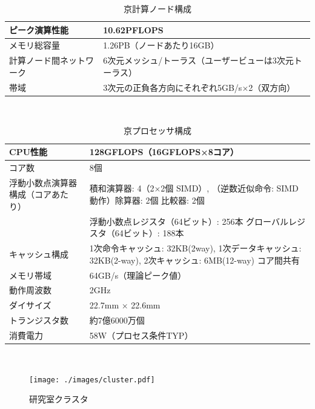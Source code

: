 \begin{table}[htb]
  \begin{center}
    \caption{京計算ノード構成}
    \begin{tabular}{|p{4cm}|p{10cm}|}
      \hline
      ピーク演算性能 & 10.62PFLOPS \\ \hline
      メモリ総容量 & 1.26PB（ノードあたり16GB）\\ \hline
      計算ノード間ネットワーク & 6次元メッシュ/トーラス（ユーザービューは3次元トーラス）\\ \hline
      帯域 & 3次元の正負各方向にそれぞれ5GB/s×2（双方向）\\ \hline
    \end{tabular}
    \label{table:k}
  \end{center}
\end{table}~\\

\vspace{2cm}
\begin{table}[ht]
  \begin{center}
    \caption{京プロセッサ構成}
    \begin{tabular}{|p{6cm}|p{8cm}|}
      \hline
      CPU性能 & 128GFLOPS（16GFLOPS×8コア）\\ \hline
      コア数 & 8個\\ \hline
      浮動小数点演算器構成（コアあたり）& 積和演算器: 4（2×2個 SIMD）, （逆数近似命令: SIMD 動作）除算器: 2個 比較器: 2個\\
      & 浮動小数点レジスタ（64ビット）: 256本 グローバルレジスタ（64ビット）: 188本\\ \hline
      キャッシュ構成 & 1次命令キャッシュ: 32KB(2way), 1次データキャッシュ: 32KB(2-way), 2次キャッシュ: 6MB(12-way) コア間共有\\ \hline
      メモリ帯域 & 64GB/s（理論ピーク値）\\ \hline
      動作周波数 & 2GHz \\ \hline
      ダイサイズ & 22.7mm × 22.6mm \\ \hline
      トランジスタ数 & 約7億6000万個 \\ \hline
      消費電力 & 58W（プロセス条件TYP）\\ \hline
    \end{tabular}
    \label{table:k-processor}
  \end{center}
\end{table}~\\
\clearpage

\begin{figure}[h]
  \begin{center}
    \texttt{[image: ./images/cluster.pdf]}
  \vspace*{-15mm}
  \caption{研究室クラスタ}
  \end{center}
  \label{fig:cluster}
\end{figure}~\\

